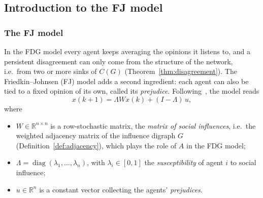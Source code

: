 \subsection{Introduction to the FJ model}
\label{subsec:fj-intro}

\subsubsection{The FJ model}
\label{subsubsec:fj-model}

In the FDG model every agent keeps averaging the opinions it listens to, and a
persistent disagreement can only come from the structure of the network, i.e.\ from
two or more sinks of $C(G)$ (Theorem~\ref{thm:disagreement}).
 The Friedkin--Johnsen (FJ)
model adds a second ingredient: each agent can also be tied to a fixed opinion of its own,
called its \emph{prejudice}. Following~\cite{proskurnikov2017tutorial}, the model reads
\begin{equation}\label{eq:fj}
  x(k+1) = \Lambda W x(k) + (I - \Lambda)\, u ,
\end{equation}
where
\begin{itemize}
  \item $W \in \mathbb{R}^{n \times n}$ is a row-stochastic matrix, the \emph{matrix of
        social influences}, i.e.\ the weighted adjacency matrix of the influence
        digraph $G$ (Definition~\ref{def:adjacency}), which plays the role of $A$ in
        the FDG model;
  \item $\Lambda = \operatorname{diag}(\lambda_1, \dots, \lambda_n)$, with
        $\lambda_i \in [0,1]$ the \emph{susceptibility} of agent $i$ to social
        influence;
  \item $u \in \mathbb{R}^n$ is a constant vector collecting the agents'
        \emph{prejudices}.
\end{itemize}
